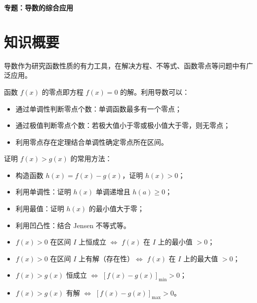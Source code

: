 \documentclass[11pt]{ctexrep}
\begin{document}
\begin{center}
    {\LARGE\bfseries 专题：导数的综合应用}
\end{center}

\section*{知识概要}

导数作为研究函数性质的有力工具，在解决方程、不等式、函数零点等问题中有广泛应用。

\begin{property}[利用导数研究函数零点]
    函数 $f(x)$ 的零点即方程 $f(x) = 0$ 的解。利用导数可以：
    \begin{itemize}
        \item 通过单调性判断零点个数：单调函数最多有一个零点；
        \item 通过极值判断零点个数：若极大值小于零或极小值大于零，则无零点；
        \item 利用零点存在定理结合单调性确定零点所在区间。
    \end{itemize}
\end{property}

\begin{property}[利用导数证明不等式]
    证明 $f(x) > g(x)$ 的常用方法：
    \begin{itemize}
        \item 构造函数 $h(x) = f(x) - g(x)$，证明 $h(x) > 0$；
        \item 利用单调性：证明 $h(x)$ 单调递增且 $h(a) \ge 0$；
        \item 利用最值：证明 $h(x)$ 的最小值大于零；
        \item 利用凹凸性：结合 Jensen 不等式等。
    \end{itemize}
\end{property}

\begin{property}[恒成立与存在性问题]
    \begin{itemize}
        \item $f(x) > 0$ 在区间 $I$ 上恒成立 $\Leftrightarrow$ $f(x)$ 在 $I$ 上的最小值 $> 0$；
        \item $f(x) > 0$ 在区间 $I$ 上有解（存在性）$\Leftrightarrow$ $f(x)$ 在 $I$ 上的最大值 $> 0$；
        \item $f(x) > g(x)$ 恒成立 $\Leftrightarrow$ $[f(x) - g(x)]_{\min} > 0$；
        \item $f(x) > g(x)$ 有解 $\Leftrightarrow$ $[f(x) - g(x)]_{\max} > 0$。
    \end{itemize}
\end{property}
\end{document}
